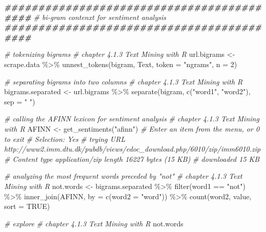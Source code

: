 \documentclass[
]{article}
\newenvironment{Shaded}{\begin{snugshade}}{\end{snugshade}}
\newcommand{\AttributeTok}[1]{\textcolor[rgb]{0.77,0.63,0.00}{#1}}
\newcommand{\CommentTok}[1]{\textcolor[rgb]{0.56,0.35,0.01}{\textit{#1}}}
\newcommand{\ConstantTok}[1]{\textcolor[rgb]{0.00,0.00,0.00}{#1}}
\newcommand{\DecValTok}[1]{\textcolor[rgb]{0.00,0.00,0.81}{#1}}
\newcommand{\DocumentationTok}[1]{\textcolor[rgb]{0.56,0.35,0.01}{\textbf{\textit{#1}}}}
\newcommand{\FunctionTok}[1]{\textcolor[rgb]{0.00,0.00,0.00}{#1}}
\newcommand{\NormalTok}[1]{#1}
\newcommand{\OtherTok}[1]{\textcolor[rgb]{0.56,0.35,0.01}{#1}}
\newcommand{\SpecialCharTok}[1]{\textcolor[rgb]{0.00,0.00,0.00}{#1}}
\newcommand{\StringTok}[1]{\textcolor[rgb]{0.31,0.60,0.02}{#1}}
\begin{document}
\begin{Shaded}
\begin{Highlighting}[]
\DocumentationTok{\#\#\#\#\#\#\#\#\#\#\#\#\#\#\#\#\#\#\#\#\#\#\#\#\#\#\#\#\#\#\#\#\#\#\#\#\#\#\#\#\#\#}
\CommentTok{\# bi{-}gram contenxt for sentiment analysis}
\DocumentationTok{\#\#\#\#\#\#\#\#\#\#\#\#\#\#\#\#\#\#\#\#\#\#\#\#\#\#\#\#\#\#\#\#\#\#\#\#\#\#\#\#\#\#}

\CommentTok{\# tokenizing bigrams}
\CommentTok{\# chapter 4.1.3 Text Mining with R}
\NormalTok{url.bigrams }\OtherTok{\textless{}{-}}\NormalTok{ scrape.data }\SpecialCharTok{\%\textgreater{}\%}
  \FunctionTok{unnest\_tokens}\NormalTok{(bigram, Text, }\AttributeTok{token =} \StringTok{"ngrams"}\NormalTok{, }\AttributeTok{n =} \DecValTok{2}\NormalTok{)}

\CommentTok{\# separating bigrams into two columns}
\CommentTok{\# chapter 4.1.3 Text Mining with R}
\NormalTok{bigrams.separated }\OtherTok{\textless{}{-}}\NormalTok{ url.bigrams }\SpecialCharTok{\%\textgreater{}\%}
  \FunctionTok{separate}\NormalTok{(bigram, }\FunctionTok{c}\NormalTok{(}\StringTok{"word1"}\NormalTok{, }\StringTok{"word2"}\NormalTok{), }\AttributeTok{sep =} \StringTok{" "}\NormalTok{)}

\CommentTok{\# calling the AFINN lexicon for sentiment analysis}
\CommentTok{\# chapter 4.1.3 Text Mining with R}
\NormalTok{AFINN }\OtherTok{\textless{}{-}} \FunctionTok{get\_sentiments}\NormalTok{(}\StringTok{"afinn"}\NormalTok{)}
\CommentTok{\# Enter an item from the menu, or 0 to exit}
\CommentTok{\# Selection: Yes}
\CommentTok{\# trying URL \textquotesingle{}http://www2.imm.dtu.dk/pubdb/views/edoc\_download.php/6010/zip/imm6010.zip\textquotesingle{}}
\CommentTok{\# Content type \textquotesingle{}application/zip\textquotesingle{} length 16227 bytes (15 KB)}
\CommentTok{\# downloaded 15 KB}

\CommentTok{\# analyzing the most frequent words preceded by "not"}
\CommentTok{\# chapter 4.1.3 Text Mining with R}
\NormalTok{not.words }\OtherTok{\textless{}{-}}\NormalTok{ bigrams.separated }\SpecialCharTok{\%\textgreater{}\%}
  \FunctionTok{filter}\NormalTok{(word1 }\SpecialCharTok{==} \StringTok{"not"}\NormalTok{) }\SpecialCharTok{\%\textgreater{}\%}
  \FunctionTok{inner\_join}\NormalTok{(AFINN, }\AttributeTok{by =} \FunctionTok{c}\NormalTok{(}\AttributeTok{word2 =} \StringTok{"word"}\NormalTok{)) }\SpecialCharTok{\%\textgreater{}\%}
  \FunctionTok{count}\NormalTok{(word2, value, }\AttributeTok{sort =} \ConstantTok{TRUE}\NormalTok{)}

\CommentTok{\# explore}
\CommentTok{\# chapter 4.1.3 Text Mining with R}
\NormalTok{not.words}
\end{Highlighting}
\end{Shaded}
\end{document}
